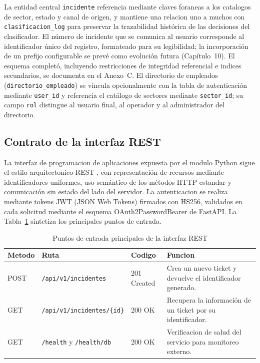La entidad central \texttt{incidente} referencia mediante claves foraneas a los catalogos de sector, estado y canal de origen, y mantiene una relacion uno a muchos con \texttt{clasificacion\_log} para preservar la trazabilidad histórica de las decisiones del clasificador. El número de incidente que se comunica al usuario corresponde al identificador único del registro, formateado para su legibilidad; la incorporación de un prefijo configurable se prevé como evolución futura (Capítulo~10). El esquema completó, incluyendo restricciones de integridad referencial e indices secundarios, se documenta en el Anexo~C. El directorio de empleados (\texttt{directorio\_empleado}) se vincula opcionalmente con la tabla de autenticación mediante \texttt{user\_id} y referencia el catálogo de sectores mediante \texttt{sector\_id}; su campo \texttt{rol} distingue al usuario final, al operador y al administrador del directorio.

\subsection{Contrato de la interfaz REST}

La interfaz de programacion de aplicaciones expuesta por el modulo Python sigue el estilo arquitectonico REST \parencite{Fielding2002_rest}, con representación de recursos mediante identificadores uniformes, uso semántico de los métodos HTTP estandar y comunicación sin estado del lado del servidor. La autenticacion se realiza mediante tokens JWT (JSON Web Tokens) firmados con HS256, validados en cada solicitud mediante el esquema OAuth2PasswordBearer de FastAPI. La Tabla~\ref{tab:api} sintetiza los principales puntos de entrada.

\begin{table}[htbp]
\centering
\caption{Puntos de entrada principales de la interfaz REST}
\label{tab:api}
\begin{tabular}{@{}p{1.8cm} >{\raggedright\arraybackslash}p{5.2cm} p{1.8cm} >{\raggedright\arraybackslash}p{4.8cm}@{}}
\toprule
\textbf{Metodo} & \textbf{Ruta} & \textbf{Codigo} & \textbf{Funcion} \\
\midrule
POST & \texttt{/api/v1/incidentes} & 201 Created & Crea un nuevo ticket y devuelve el identificador generado. \\
GET & \texttt{/api/v1/incidentes/\{id\}} & 200 OK & Recupera la información de un ticket por su identificador. \\
GET & \texttt{/health} y \texttt{/health/db} & 200 OK & Verificacion de salud del servicio para monitoreo externo. \\
\bottomrule
\end{tabular}
\end{table}

